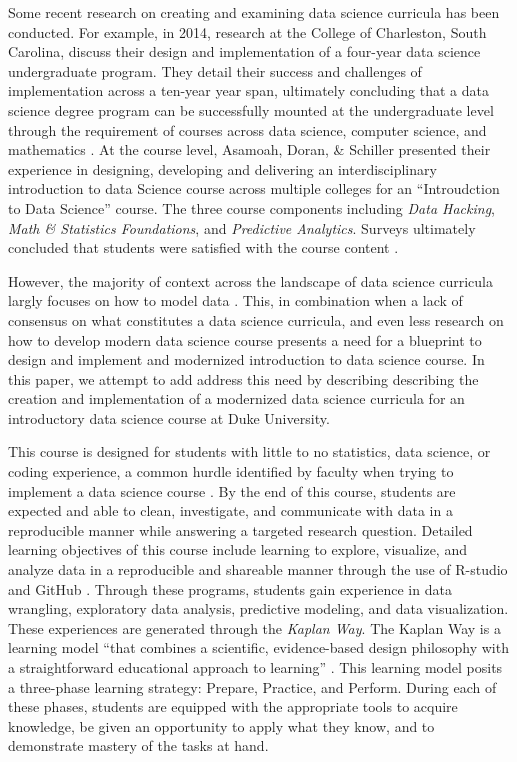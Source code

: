 \documentclass[
  12pt]{article}
\begin{document}
Some recent research on creating and examining data science curricula
has been conducted. For example, in 2014, research at the College of
Charleston, South Carolina, discuss their design and implementation of a
four-year data science undergraduate program. They detail their success
and challenges of implementation across a ten-year year span, ultimately
concluding that a data science degree program can be successfully
mounted at the undergraduate level through the requirement of courses
across data science, computer science, and mathematics
\citep{Anderson2014}. At the course level, Asamoah, Doran, \& Schiller
presented their experience in designing, developing and delivering an
interdisciplinary introduction to data Science course across multiple
colleges for an ``Introudction to Data Science'' course. The three
course components including \emph{Data Hacking}, \emph{Math \&
Statistics Foundations}, and \emph{Predictive Analytics}. Surveys
ultimately concluded that students were satisfied with the course
content \citep{Asamoah2015}.

However, the majority of context across the landscape of data science
curricula largly focuses on how to model data \citep{Donoho2017}. This,
in combination when a lack of consensus on what constitutes a data
science curricula, and even less research on how to develop modern data
science course presents a need for a blueprint to design and implement
and modernized introduction to data science course. In this paper, we
attempt to add address this need by describing describing the creation
and implementation of a modernized data science curricula for an
introductory data science course at Duke University.

This course is designed for students with little to no statistics, data
science, or coding experience, a common hurdle identified by faculty
when trying to implement a data science course \citep{Schwab2020}. By
the end of this course, students are expected and able to clean,
investigate, and communicate with data in a reproducible manner while
answering a targeted research question. Detailed learning objectives of
this course include learning to explore, visualize, and analyze data in
a reproducible and shareable manner through the use of R-studio and
GitHub \citep{R21, github}. Through these programs, students gain
experience in data wrangling, exploratory data analysis, predictive
modeling, and data visualization. These experiences are generated
through the \emph{Kaplan Way}. The Kaplan Way is a learning model ``that
combines a scientific, evidence-based design philosophy with a
straightforward educational approach to learning''
\citep{schweser_2023}. This learning model posits a three-phase learning
strategy: Prepare, Practice, and Perform. During each of these phases,
students are equipped with the appropriate tools to acquire knowledge,
be given an opportunity to apply what they know, and to demonstrate
mastery of the tasks at hand.
\end{document}

